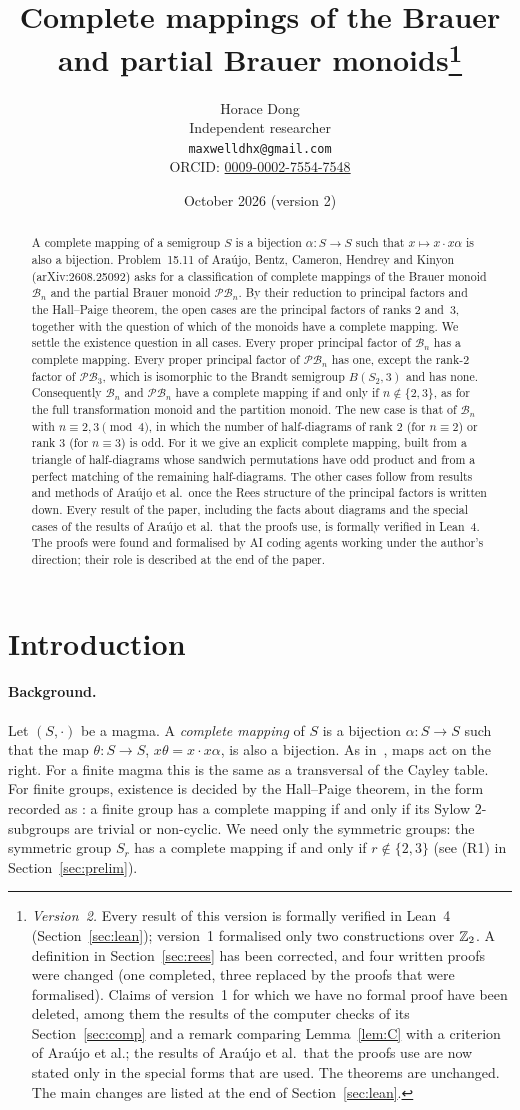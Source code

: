 \documentclass[11pt]{article}
\title{Complete mappings of the Brauer\\ and partial Brauer
monoids\thanks{\emph{Version~2.} Every result of this version is formally
verified in Lean~4 (Section~\ref{sec:lean}); version~1 formalised only two
constructions over $\mathbb Z_2$. A definition in Section~\ref{sec:rees} has been
corrected, and four written proofs were changed (one completed, three
replaced by the proofs that were formalised). Claims of version~1 for which
we have no formal proof have been
deleted, among them the results of the computer checks of its
Section~\ref{sec:comp} and a remark comparing Lemma~\ref{lem:C} with a
criterion of Ara\'ujo et al.; the results of Ara\'ujo et al.\ that the proofs
use are now stated only in the special forms that are used. The theorems are
unchanged. The main changes are listed at the end of
Section~\ref{sec:lean}.}}
\author{Horace Dong\\ \small Independent researcher\\
\small\texttt{maxwelldhx@gmail.com}\\
\small ORCID: \href{https://orcid.org/0009-0002-7554-7548}{0009-0002-7554-7548}}
\date{October 2026 (version 2)}
\theoremstyle{remark}
\newcommand{\B}{\mathcal B}
\newcommand{\PB}{\mathcal{PB}}
\begin{document}
\maketitle
\begin{abstract}
A complete mapping of a semigroup $S$ is a bijection $\alpha\colon S\to S$
such that $x\mapsto x\cdot x\alpha$ is also a bijection. Problem~15.11 of
Ara\'ujo, Bentz, Cameron, Hendrey and Kinyon (arXiv:2608.25092) asks for a
classification of complete mappings of the Brauer monoid $\B_n$ and the
partial Brauer monoid $\PB_n$. By their reduction to principal factors and the
Hall--Paige theorem, the open cases are the principal factors of ranks $2$
and~$3$, together with the question of which of the monoids have a complete
mapping. We settle the existence question in all cases. Every proper
principal factor of $\B_n$ has a complete mapping. Every proper principal
factor of $\PB_n$ has one, except the rank-$2$ factor of $\PB_3$, which is
isomorphic to the Brandt semigroup $B(S_2,3)$ and has none. Consequently $\B_n$ and $\PB_n$ have
a complete mapping if and only if $n\notin\{2,3\}$, as for the full
transformation monoid and the partition monoid. The new case is that of $\B_n$
with $n\equiv2,3\pmod 4$, in which the number of half-diagrams of rank $2$
(for $n\equiv2$) or rank $3$ (for $n\equiv3$) is odd. For it we give an explicit complete mapping, built from a triangle
of half-diagrams whose sandwich permutations have odd product and from a
perfect matching of the remaining half-diagrams. The other cases follow from
results and methods of Ara\'ujo et al.\ once the Rees structure of the
principal factors is written down. Every result of the paper, including the
facts about diagrams and the special cases of the results of Ara\'ujo et al.\
that the proofs use, is formally verified in Lean~4. The proofs were found and
formalised by AI coding agents working under the author's direction; their
role is described at the end of the paper.
\end{abstract}

\section{Introduction}

\paragraph{Background.}
Let $(S,\cdot)$ be a magma. A \emph{complete mapping} of $S$ is a bijection
$\alpha\colon S\to S$ such that the map $\theta\colon S\to S$,
$x\theta=x\cdot x\alpha$, is also a bijection. As in~\cite{abchk}, maps act on
the right. For a finite magma this is the same as a transversal of the Cayley
table. For finite groups, existence is decided by the Hall--Paige theorem, in
the form recorded as \cite[Theorem~1.1]{abchk}: a finite group has a complete
mapping if and only if its Sylow $2$-subgroups are trivial or non-cyclic. We
need only the symmetric groups: the symmetric group $S_r$ has a complete
mapping if and only if $r\notin\{2,3\}$ (see (R1) in
Section~\ref{sec:prelim}).
\end{document}
